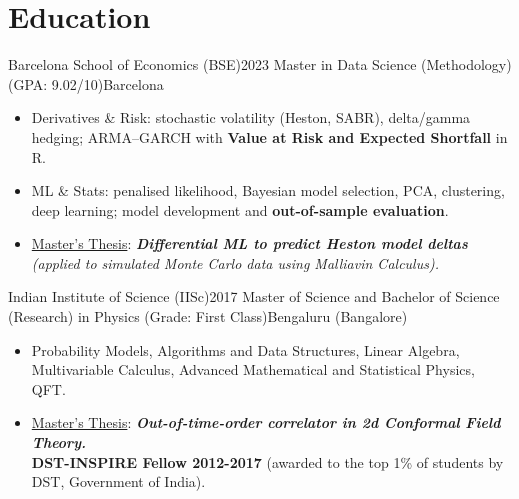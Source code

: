 \section*{Education}
\vspace{-2pt}
  \resumeSubHeadingListStart
    \resumeSubheading
  {Barcelona School of Economics (BSE)}{2023}
  {Master in Data Science (Methodology) (GPA: 9.02/10)}{Barcelona}
\begin{itemize}[leftmargin=*, noitemsep=2, partopsep=0pt]
\vspace{3pt}
    \item Derivatives \& Risk: stochastic volatility (Heston, SABR), delta/gamma hedging; ARMA–GARCH with \textbf{Value at Risk and Expected Shortfall} in R.
\vspace{1pt}
    \item ML \& Stats: penalised likelihood, Bayesian model selection, PCA, clustering, deep learning; model development and \textbf{out-of-sample evaluation}.
\vspace{1pt}
    \item \underline{Master's Thesis}: \textit{\textbf{Differential ML to predict Heston model deltas} (applied to simulated Monte Carlo data using Malliavin Calculus).} 

\end{itemize}    


    \resumeSubheading
      {Indian Institute of Science (IISc)}{2017}
      {Master of Science and Bachelor of Science (Research) in Physics  (Grade: First Class)}{Bengaluru (Bangalore)}
\begin{itemize}[leftmargin=*, noitemsep=2, partopsep=0pt]
\vspace{3pt}
    \item Probability Models, Algorithms and Data Structures, Linear Algebra, Multivariable Calculus, Advanced Mathematical and Statistical Physics, QFT.
\vspace{1pt}
    \item \underline{Master's Thesis}: \textit{\textbf{Out-of-time-order correlator in 2d Conformal Field Theory.}}\\
    \textbf{DST-INSPIRE Fellow 2012-2017} (awarded to the top 1\% of students by DST, Government of India). 
\end{itemize}    

